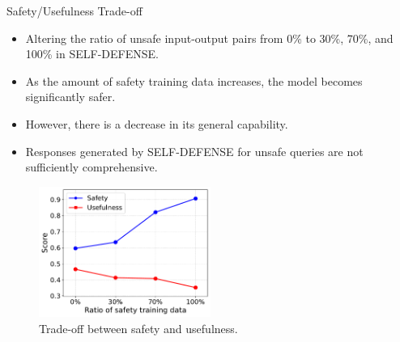 \begin{frame}{Safety/Usefulness Trade-off}
    \begin{itemize}
        \item Altering the ratio of unsafe input-output pairs from 0\% to 30\%, 70\%, and 100\% in SELF-DEFENSE.
        \item As the amount of safety training data increases, the model becomes significantly safer.
        \item However, there is a decrease in its general capability.
        \item Responses generated by SELF-DEFENSE for unsafe queries are not sufficiently comprehensive.
    \end{itemize}
    \begin{figure}
        \centering
        \includegraphics[width=0.5\textwidth]{pic/tradeoff}
        \caption{Trade-off between safety and usefulness.}
        \label{fig:trade_off}
    \end{figure}
\end{frame}